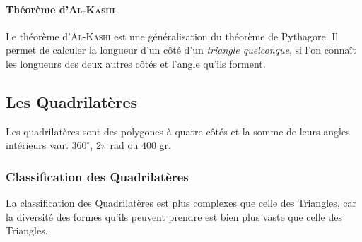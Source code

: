 \documentclass[a4paper, twoside]{article}
\begin{document}










\paragraph*{Théorème d'\textsc{Al-Kashi}}

\phantom{text}

Le théorème d'\textsc{Al-Kashi} est une généralisation du théorème de Pythagore.
Il permet de calculer la longueur d'un côté d'un \textit{triangle quelconque},
si l'on connaît les longueurs des deux autres côtés et l'angle qu'ils forment.




\newpage

\subsection{Les Quadrilatères} \label{quadrilateres}

Les quadrilatères sont des polygones à quatre côtés et la somme de leurs angles
intérieurs vaut $360^\circ$, $2 \pi$ rad ou $400$ gr.

\subsubsection{Classification des Quadrilatères}

La classification des Quadrilatères est plus complexes que celle
des Triangles, car la diversité des formes qu'ils peuvent prendre
est bien plus vaste que celle des Triangles.
\end{document}
